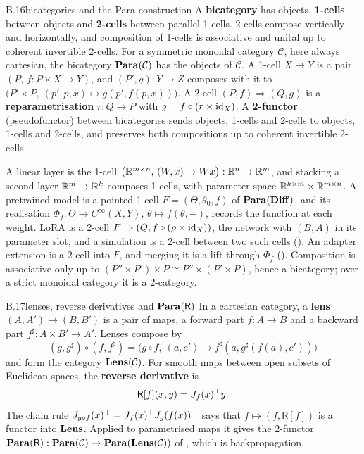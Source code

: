 \begin{bgentry}{B.16}{bicategories and the Para construction}
A \textbf{bicategory} has objects, \textbf{1-cells} between objects and \textbf{2-cells} between parallel 1-cells.
2-cells compose vertically and horizontally, and composition of 1-cells is associative and unital up to coherent
invertible 2-cells. For a symmetric monoidal category $\mathcal C$, here always cartesian, the bicategory
$\mathbf{Para}(\mathcal C)$ has the objects of $\mathcal C$. A 1-cell $X\to Y$ is a pair $(P,\,f:P\times X\to Y)$, and
$(P',g):Y\to Z$ composes with it to $\big(P'\times P,\ (p',p,x)\mapsto g(p',f(p,x))\big)$. A 2-cell
$(P,f)\Rightarrow(Q,g)$ is a \textbf{reparametrisation} $r:Q\to P$ with $g=f\circ(r\times\mathrm{id}_X)$. A \textbf{2-functor}
(pseudofunctor) between bicategories sends objects, 1-cells and 2-cells to objects, 1-cells and 2-cells, and preserves
both compositions up to coherent invertible 2-cells.
\end{bgentry}

A linear layer is the 1-cell $\big(\mathbb{R}^{m\times n},\,(W,x)\mapsto Wx\big):\mathbb{R}^n\to\mathbb{R}^m$, and stacking a second layer
$\mathbb{R}^m\to\mathbb{R}^k$ composes 1-cells, with parameter space $\mathbb{R}^{k\times m}\times\mathbb{R}^{m\times n}$. A pretrained model is a
pointed 1-cell $F=(\Theta,\theta_0,f)$ of $\mathbf{Para}(\mathbf{Diff})$, and its realisation $\Phi_f:\Theta\to C^\infty(X,Y)$,
$\theta\mapsto f(\theta,-)$, records the function at each weight. LoRA is a 2-cell
$F\Rightarrow(Q,f\circ(\rho\times\mathrm{id}_X))$, the network with $(B,A)$ in its parameter slot, and a simulation is a 2-cell
between two such cells (). An adapter extension is a 2-cell into $F$, and merging it is a lift
through $\Phi_f$ (). Composition is associative only up to
$(P''\times P')\times P\cong P''\times(P'\times P)$, hence a bicategory; over a strict monoidal category it is a
2-category.


\begin{bgentry}{B.17}{lenses, reverse derivatives and $\mathbf{Para}(\mathsf R)$}
In a cartesian category, a \textbf{lens} $(A,A')\to(B,B')$ is a pair of maps, a forward part $f:A\to B$ and a backward
part $f^\sharp:A\times B'\to A'$. Lenses compose by
\begin{equation*}
  (g,g^\sharp)\circ(f,f^\sharp)=\big(g\circ f,\ (a,c')\mapsto f^\sharp(a,g^\sharp(f(a),c'))\big)
\end{equation*}
and form the category $\mathbf{Lens}(\mathcal C)$. For smooth maps between open subsets of Euclidean spaces, the \textbf{reverse
derivative} is
\begin{equation*}
  \mathsf R[f](x,y)=J_f(x)^{\top} y.
\end{equation*}
The chain rule $J_{g\circ f}(x)^{\top}=J_f(x)^{\top} J_g(f(x))^{\top}$ says that
$f\mapsto(f,\mathsf R[f])$ is a functor into $\mathbf{Lens}$. Applied to parametrised maps it gives the 2-functor
$\mathbf{Para}(\mathsf R):\mathbf{Para}(\mathcal C)\to\mathbf{Para}(\mathbf{Lens}(\mathcal C))$ of \citet{cruttwell2021categorical}, which is
backpropagation.
\end{bgentry}

